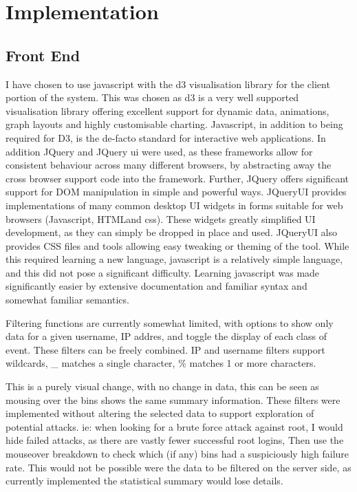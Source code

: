 \chapter{Implementation}\label{C:impl}

\section{Front End}  %

I have chosen to use javascript with the d3 visualisation library \cite{bostock2011d3} for the client portion of the system. This was chosen as d3 is a very well supported visualisation library offering excellent support for dynamic data, animations, graph layouts and highly customisable charting. Javascript, in addition to being required for D3, is the de-facto standard for interactive web applications. 
In addition JQuery and JQuery ui were used, as these frameworks allow for consistent behaviour across many different browsers, by abstracting away the cross browser support code into the framework. Further, JQuery offers significant support for DOM manipulation in simple and powerful ways. JQueryUI provides implementations of many common desktop UI widgets in forms suitable for web browsers (Javascript, HTMLand css). These widgets greatly simplified UI development, as they can simply be dropped in place and used. JQueryUI also provides CSS files and tools allowing easy tweaking or theming of the tool.
While this required learning a new language, javascript is a relatively simple language, and this did not pose a significant difficulty. Learning javascript was made significantly easier by extensive documentation and familiar syntax and somewhat familiar semantics. 

Filtering functions are currently somewhat limited, with options to show only data for a given username, IP addres, and toggle the display of each class of event. These filters can be freely combined. IP and username filters support wildcards, \_ matches a single character, \% matches 1 or more characters. 

This is a purely visual change, with no change in data, this can be seen as mousing over the bins shows the same summary information. These filters were implemented without altering the selected data to support exploration of potential attacks. ie: when looking for a brute force attack against root, I would hide failed attacks, as there are vastly fewer successful root logins, Then use the mouseover breakdown to check which (if any) bins had a suspiciously high failure rate. This would not be possible were the data to be filtered on the server side, as currently implemented the statistical summary would lose details.


